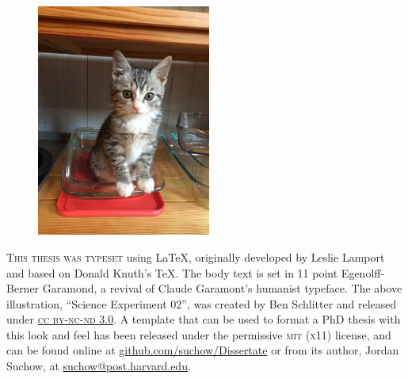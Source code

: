 \newpage

\begin{figure}
  \vspace{50pt}
  \centering
    \includegraphics[width=0.51\textwidth]{endmatter/myshka.jpg}
\end{figure}


\begin{center}
\parbox{200pt}{\lettrine[lines=3,slope=-2pt,nindent=-4pt]{\textcolor{SchoolColor}{T}}{his thesis was typeset} using \LaTeX, originally developed by Leslie Lamport and based on Donald Knuth's \TeX. The body text is set in 11 point Egenolff-Berner Garamond, a revival of Claude Garamont's humanist typeface. The above illustration, ``Science Experiment 02'', was created by Ben Schlitter and released under \href{http://creativecommons.org/licenses/by-nc-nd/3.0/}{\textsc{cc by-nc-nd 3.0}}. A template that can be used to format a PhD thesis with this look and feel has been released under the permissive \textsc{mit} (\textsc{x}11) license, and can be found online at \href{https://github.com/suchow/Dissertate}{github.com/suchow/Dissertate} or from its author, Jordan Suchow, at \href{mailto:suchow@post.harvard.edu}{suchow@post.harvard.edu}.}
\end{center}